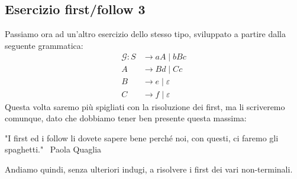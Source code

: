 \documentclass[class=book, crop=false, oneside, 12pt]{standalone}
\begin{document}
\subsection{Esercizio first/follow 3}
\label{first-folllow-ex-3}
Passiamo ora ad un'altro esercizio dello stesso tipo, sviluppato a partire dalla seguente grammatica:
\begin{align*}
    \mathcal{G}: S &\to aA \mid bBc \\
    A &\to Bd \mid Cc \\
    B &\to e \mid \varepsilon \\
    C &\to f \mid \varepsilon
\end{align*}
Questa volta saremo più spigliati con la risoluzione dei first, ma li scriveremo comunque, dato che dobbiamo tener ben presente questa massima:
\begin{displayquote}
    "I first ed i follow li dovete sapere bene perché noi, con questi, ci faremo gli spaghetti."
    ~Paola Quaglia
\end{displayquote}

\noindent Andiamo quindi, senza ulteriori indugi, a risolvere i first dei vari non-terminali.
\end{document}
